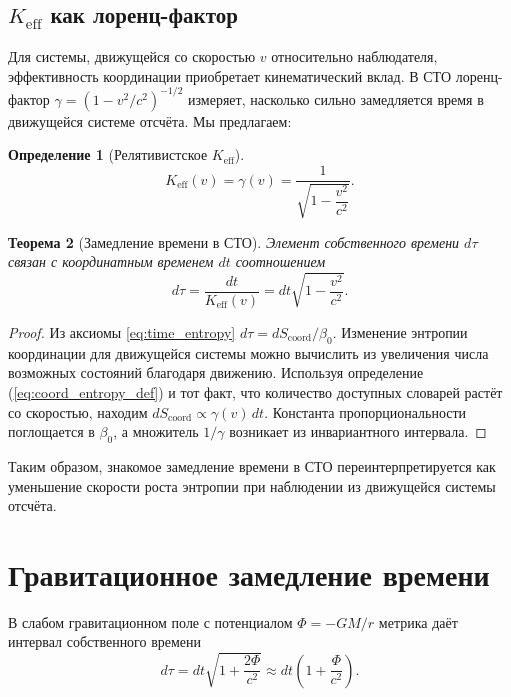 \documentclass[12pt,a4paper]{article}
\newtheorem{theorem}{Теорема}[section]
\newtheorem{definition}[theorem]{Определение}
\newcommand{\Keff}{K_{\mathrm{eff}}}
\newcommand{\Scoord}{S_{\mathrm{coord}}}
\begin{document}
	\subsection{\(\Keff\) как лоренц-фактор}
	
	Для системы, движущейся со скоростью \(v\) относительно наблюдателя, эффективность координации приобретает кинематический вклад. В СТО лоренц-фактор \(\gamma = (1-v^2/c^2)^{-1/2}\) измеряет, насколько сильно замедляется время в движущейся системе отсчёта. Мы предлагаем:
	\begin{definition}[Релятивистское \(\Keff\)]
		\[
		\Keff(v) = \gamma(v) = \frac{1}{\sqrt{1-\dfrac{v^2}{c^2}}}.
		\]
	\end{definition}
	
	\begin{theorem}[Замедление времени в СТО]
		Элемент собственного времени \(d\tau\) связан с координатным временем \(dt\) соотношением
		\begin{equation}
			d\tau = \frac{dt}{\Keff(v)} = dt\sqrt{1-\frac{v^2}{c^2}}.
		\end{equation}
	\end{theorem}
	
	\begin{proof}
		Из аксиомы \ref{eq:time_entropy} \(d\tau = d\Scoord/\beta_0\). Изменение энтропии координации для движущейся системы можно вычислить из увеличения числа возможных состояний благодаря движению. Используя определение (\ref{eq:coord_entropy_def}) и тот факт, что количество доступных словарей растёт со скоростью, находим \(d\Scoord \propto \gamma(v)\, dt\). Константа пропорциональности поглощается в \(\beta_0\), а множитель \(1/\gamma\) возникает из инвариантного интервала.
	\end{proof}
	
	Таким образом, знакомое замедление времени в СТО переинтерпретируется как уменьшение скорости роста энтропии при наблюдении из движущейся системы отсчёта.
	
	\section{Гравитационное замедление времени}
	\label{sec:gr}
	
	В слабом гравитационном поле с потенциалом \(\Phi = -GM/r\) метрика даёт интервал собственного времени
	\begin{equation}
		d\tau = dt\sqrt{1 + \frac{2\Phi}{c^2}} \approx dt\left(1 + \frac{\Phi}{c^2}\right).
	\end{equation}
	
\end{document}
